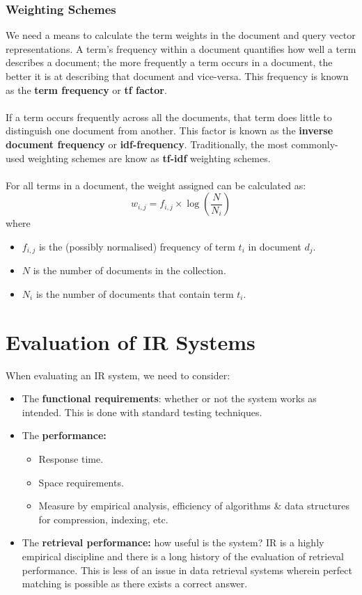 \documentclass[a4paper,11pt]{article}
\begin{document}
\subsubsection{Weighting Schemes}
We need a means to calculate the term weights in the document and query vector representations.
A term's frequency within a document quantifies how well a term describes a document;
the more frequently a term occurs in a document, the better it is at describing that document and vice-versa.
This frequency is known as the \textbf{term frequency} or \textbf{tf factor}.
\\\\
If a term occurs frequently across all the documents, that term does little to distinguish one document from another.
This factor is known as the \textbf{inverse document frequency} or \textbf{idf-frequency}.
Traditionally, the most commonly-used weighting schemes are know as \textbf{tf-idf} weighting schemes.
\\\\
For all terms in a document, the weight assigned can be calculated as:
$$
w_{i,j} = f_{i,j} \times \log \left( \frac{N}{N_i} \right)
$$
where
\begin{itemize}
    \item   $f_{i,j}$ is the (possibly normalised) frequency of term $t_i$ in document $d_j$.
    \item   $N$ is the number of documents in the collection.
    \item   $N_i$ is the number of documents that contain term $t_i$.
\end{itemize}

\section{Evaluation of IR Systems}
When evaluating an IR system, we need to consider:
\begin{itemize}
    \item   The \textbf{functional requirements}: whether or not the system works as intended.
            This is done with standard testing techniques.
    \item   The \textbf{performance:} 
            \begin{itemize}
                \item   Response time.
                \item   Space requirements.
                \item   Measure by empirical analysis, efficiency of algorithms \& data structures for compression,
                        indexing, etc.
            \end{itemize}
    \item   The \textbf{retrieval performance:} how useful is the system?
            IR is a highly empirical discipline and there is a long history of the evaluation of retrieval performance.
            This is less of an issue in data retrieval systems wherein perfect matching is possible as there exists
            a correct answer.
\end{itemize}
\end{document}
